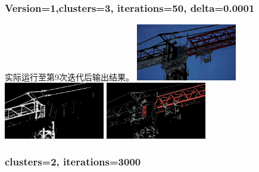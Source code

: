 \documentclass{article}
\begin{document}
\subsubsection{Version=1,clusters=3, iterations=50, delta=0.0001}
实际运行至第9次迭代后输出结果。
\includegraphics[width=0.33\textwidth]{src/i9d1e-4section1.png}
\includegraphics[width=0.33\textwidth]{src/i9d1e-4section2.png}
\includegraphics[width=0.33\textwidth]{src/i9d1e-4section3.png}\\

\subsubsection{clusters=2, iterations=3000}
\end{document}
